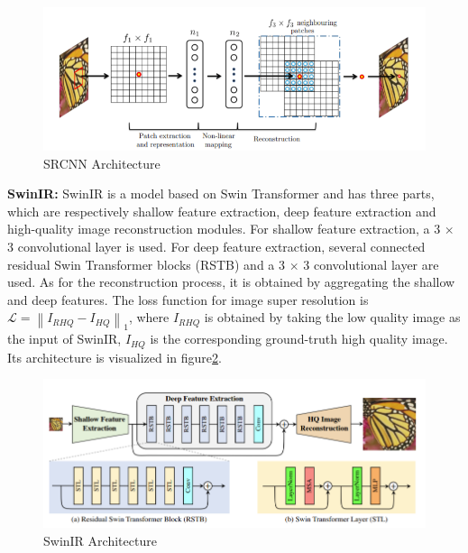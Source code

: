 \documentclass[10pt,twocolumn,letterpaper]{article}
\begin{document}
\begin{figure}[h]
    \centering
    \includegraphics[width=\linewidth]{SRCNN.png}
    \caption{SRCNN Architecture\cite{dong2015image}}
    \label{fig:srcnn}
\end{figure}

{\bf SwinIR: } SwinIR is a model based on Swin Transformer and has three parts, which are respectively shallow feature
extraction, deep feature extraction and high-quality image
reconstruction modules\cite{liang2021swinir}. For shallow feature extraction, a 3 $\times$ 3 convolutional layer is used. For deep feature extraction, several connected residual Swin Transformer blocks (RSTB) and a 3 $\times$ 3 convolutional layer are used. As for the reconstruction process, it is obtained by aggregating the shallow and deep features. The loss function for image super resolution is $\mathcal{L}=\left\|I_{R H Q}-I_{H Q}\right\|_{1}$, where $I_{RHQ}$ is obtained by taking the low quality image as the input of SwinIR,
$I_{HQ}$ is the corresponding ground-truth high quality image. Its architecture is visualized in figure\ref{fig:swinir}.

\begin{figure}[h]
    \centering
    \includegraphics[width=\linewidth]{swinir.png}
    \caption{SwinIR Architecture\cite{liang2021swinir}}
    \label{fig:swinir}
\end{figure}
\end{document}
